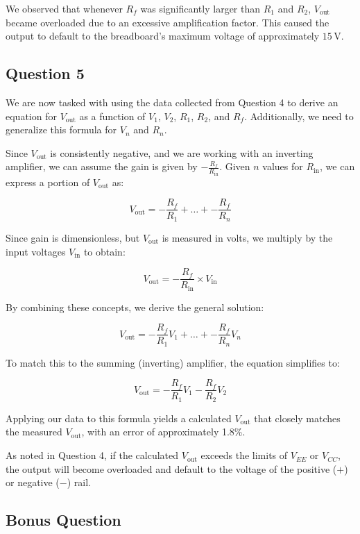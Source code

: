 \documentclass{article}
\begin{document}
We observed that whenever \( R_f \) was significantly larger than \( R_1 \) and \( R_2 \), \( V_{\text{out}} \)
became overloaded due to an excessive amplification factor. This caused the output to default to 
the breadboard's maximum voltage of approximately \( 15 \, \text{V} \).

\subsection*{Question 5}

We are now tasked with using the data collected from Question 4 to derive 
an equation for \( V_{\text{out}} \) as a function of \( V_1 \), \( V_2 \), \( R_1 \), \( R_2 \), and \( R_f \). 
Additionally, we need to generalize this formula for \( V_n \) and \( R_n \).

Since \( V_{\text{out}} \) is consistently negative, and we are working with an inverting 
amplifier, we can assume the gain is given by \( -\frac{R_f}{R_{\text{in}}} \). 
Given \( n \) values for \( R_{\text{in}} \), we can express a portion of \( V_{\text{out}} \) as:

\[
V_{\text{out}} = -\frac{R_f}{R_1} + \ldots + -\frac{R_f}{R_n}
\]

Since gain is dimensionless, but \( V_{\text{out}} \) is measured in 
volts, we multiply by the input voltages \( V_{\text{in}} \) to obtain:

\[
V_{\text{out}} = -\frac{R_f}{R_{\text{in}}} \times V_{\text{in}}
\]

By combining these concepts, we derive the general solution:

\[
V_{\text{out}} = -\frac{R_f}{R_1} V_1 + \ldots + -\frac{R_f}{R_n} V_n
\]

To match this to the summing (inverting) amplifier, the equation simplifies to:

\[
V_{\text{out}} = -\frac{R_f}{R_1} V_1 - \frac{R_f}{R_2} V_2
\]

Applying our data to this formula yields a calculated \( V_{\text{out}} \) that closely 
matches the measured \( V_{\text{out}} \), with an error of approximately 1.8\%.

As noted in Question 4, if the calculated \( V_{\text{out}} \) exceeds the 
limits of \( V_{EE} \) or \( V_{CC} \), the output will become overloaded 
and default to the voltage of the positive (\(+\)) or negative (\(-\)) rail.


\subsection*{Bonus Question}
\end{document}

